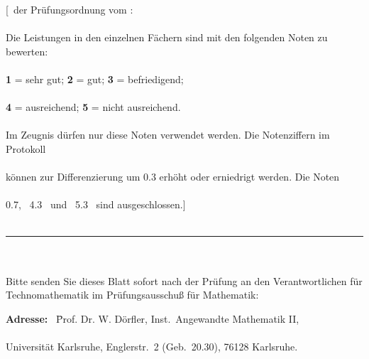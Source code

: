 \vspace*{0.3cm}
[\PRUEFORDPARA\ der Pr\"ufungsordnung vom \PRUEFORDDAT: \\\\
Die Leistungen in den einzelnen F\"achern sind mit den folgenden Noten
zu bewerten: \\\\
\hspace*{3cm} {\bf 1} = sehr gut; \hspace*{2cm} {\bf 2} = gut; \hspace*{2cm}
{\bf 3} = befriedigend; \\\\
\hspace*{3cm} {\bf 4} = ausreichend; \hspace*{1.4cm} {\bf 5} =
nicht ausreichend. \\\\
Im Zeugnis d\"urfen nur diese Noten verwendet werden. Die Notenziffern
im Protokoll \\\\
k\"onnen zur Differenzierung um 0.3 erh\"oht oder erniedrigt werden.
Die Noten \\\\
0.7, \ 4.3 \ und \ 5.3 \ sind ausgeschlossen.] \\\\
\rule{15.8cm}{0.03in} \\\\
Bitte senden Sie dieses Blatt sofort nach der Pr\"ufung an den
Verantwortlichen f\"ur Technomathematik im Pr\"ufungsausschu\ss{} f\"ur
Mathematik:

\vspace*{-0.3cm}
\begin{tabbing}
{\bf Adresse:} \ \= Prof. Dr. W. D\"orfler, Inst.~Angewandte Mathematik II, \\\\
\> Universit\"at Karlsruhe, Englerstr.\ 2 (Geb.~20.30), 76128
Karlsruhe.
\end{tabbing}

